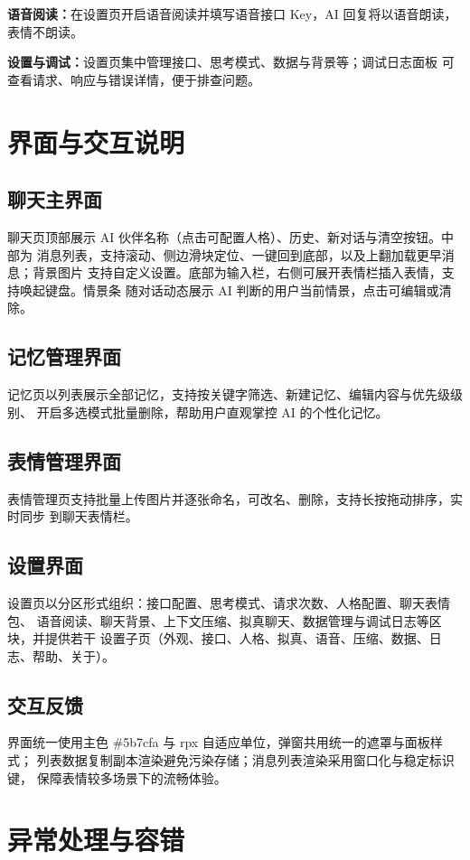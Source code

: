 \documentclass[zihao=5,a4paper]{ctexart}
\begin{document}
\textbf{语音阅读：}在设置页开启语音阅读并填写语音接口 Key，AI 回复将以语音朗读，
表情不朗读。

\textbf{设置与调试：}设置页集中管理接口、思考模式、数据与背景等；调试日志面板
可查看请求、响应与错误详情，便于排查问题。

\section{界面与交互说明}

\subsection{聊天主界面}
聊天页顶部展示 AI 伙伴名称（点击可配置人格）、历史、新对话与清空按钮。中部为
消息列表，支持滚动、侧边滑块定位、一键回到底部，以及上翻加载更早消息；背景图片
支持自定义设置。底部为输入栏，右侧可展开表情栏插入表情，支持唤起键盘。情景条
随对话动态展示 AI 判断的用户当前情景，点击可编辑或清除。

\subsection{记忆管理界面}
记忆页以列表展示全部记忆，支持按关键字筛选、新建记忆、编辑内容与优先级级别、
开启多选模式批量删除，帮助用户直观掌控 AI 的个性化记忆。

\subsection{表情管理界面}
表情管理页支持批量上传图片并逐张命名，可改名、删除，支持长按拖动排序，实时同步
到聊天表情栏。

\subsection{设置界面}
设置页以分区形式组织：接口配置、思考模式、请求次数、人格配置、聊天表情包、
语音阅读、聊天背景、上下文压缩、拟真聊天、数据管理与调试日志等区块，并提供若干
设置子页（外观、接口、人格、拟真、语音、压缩、数据、日志、帮助、关于）。

\subsection{交互反馈}
界面统一使用主色 \#5b7cfa 与 rpx 自适应单位，弹窗共用统一的遮罩与面板样式；
列表数据复制副本渲染避免污染存储；消息列表渲染采用窗口化与稳定标识键，
保障表情较多场景下的流畅体验。

\section{异常处理与容错}
\end{document}
